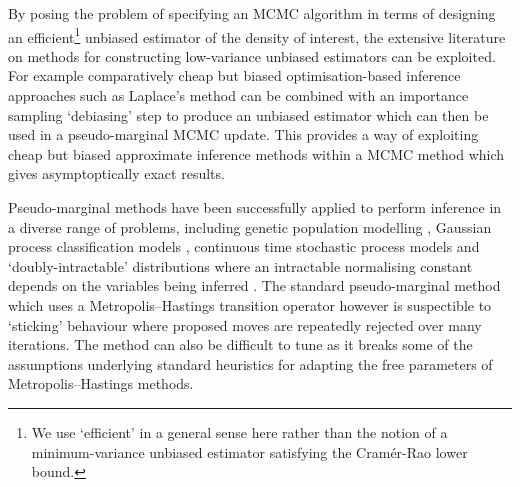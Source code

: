 By posing the problem of specifying an \ac{MCMC} algorithm in terms of designing an efficient\footnote{We use `efficient' in a general sense here rather than the notion of a minimum-variance unbiased estimator satisfying the Cram\'{e}r-Rao lower bound.} unbiased estimator of the density of interest, the extensive literature on methods for constructing low-variance unbiased estimators can be exploited. For example comparatively cheap but biased optimisation-based inference approaches such as Laplace's method can be combined with an importance sampling `debiasing' step to produce an unbiased estimator which can then be used in a pseudo-marginal \ac{MCMC} update. This provides a way of exploiting cheap but biased approximate inference methods within a \ac{MCMC} method which gives asymptoptically exact results.

Pseudo-marginal methods have been successfully applied to perform inference in a diverse range of problems, including genetic population modelling \citep{beaumont2003estimation}, Gaussian process classification models \citep{filippone2014pseudo}, continuous time stochastic process models \citep{georgoulas2015unbiased} and `doubly-intractable' distributions where an intractable normalising constant depends on the variables being inferred \cite{murray2006mcmc,moller2006efficient,lyne2015russian}. The standard pseudo-marginal method which uses a Metropolis--Hastings transition operator however is suspectible to `sticking' behaviour where proposed moves are repeatedly rejected over many iterations. The method can also be difficult to tune as it breaks some of the assumptions underlying standard heuristics for adapting the free parameters of Metropolis--Hastings methods.



